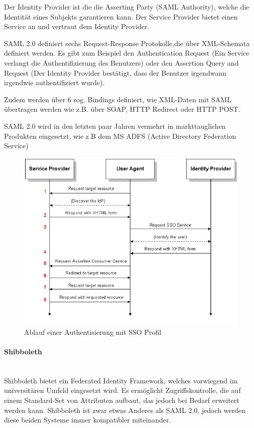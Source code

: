 \documentclass[a4paper, 11pt]{article}
\begin{document}
Der Identity Provider ist die die Asserting Party (SAML Authority), welche die Identität eines Subjekts garantieren kann. Der Service Provider bietet einen Service an und vertraut dem Identity Provider.

\vspace{10px}

\noindent SAML 2.0 definiert sechs Request-Response Protokolle,die über XML-Schemata definiert werden. Es gibt zum Beispiel den Authentication Request (Ein Service verlangt die Authentifizierung des Benutzers) oder den Assertion Query and Request (Der Identity Provider bestätigt, dass der Benutzer irgendwann irgendwie authentifiziert wurde).

\vspace{10px}

\noindent Zudem werden über 6 sog. Bindings definiert, wie XML-Daten mit SAML übertragen werden wie z.B. über SOAP, HTTP Redirect oder HTTP POST.

\vspace{10px}

\noindent SAML 2.0 wird in den letzten paar Jahren vermehrt in markttauglichen Produkten eingesetzt, wie z.B dem MS ADFS (Active Directory Federation Service)

\begin{figure}[htb]
	\centering
	\includegraphics[keepaspectratio=true,height=20\baselineskip]{sso.jpg}
	\caption{Ablauf einer Authentisierung mit SSO Profil}
	\label{fig:sso}
\end{figure}

\paragraph{Shibboleth}\mbox{}\\
Shibboleth bietet ein Federated Identity Framework, welches vorwiegend im universitären Umfeld eingesetzt wird. Es ermöglicht Zugriffskontrolle, die auf einem Standard-Set von Attributen aufbaut, das jedoch bei Bedarf erweitert werden kann. Shibboleth ist zwar etwas Anderes als SAML 2.0, jedoch werden diese beiden Systeme immer kompatibler miteinander.
\end{document}
